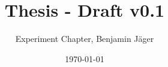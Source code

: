 

\endofdump


% 

\newif\ifIMAGES
\IMAGEStrue




\author{Experiment Chapter, Benjamin Jäger}
\date{\today}
\title{Thesis - Draft v0.1}



\maketitle

\tableofcontents


\newcommand{\chapterdir}{chapters}














